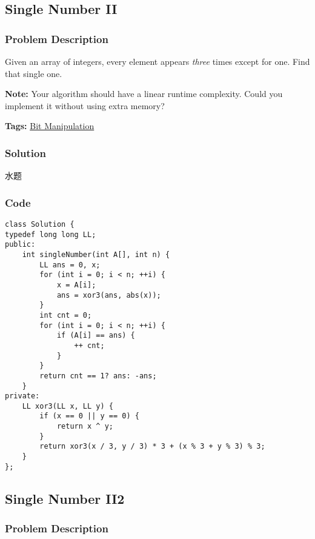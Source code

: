 \documentclass{article}
\begin{document}
\begin{CJK*}{UTF8}{gkai}
\subsection{ Single Number II }
\label{ Single Number II }

\subsubsection*{Problem Description}
Given an array of integers, every element appears \emph{three} times except for one. Find that single one.

\textbf{Note:}
Your algorithm should have a linear runtime complexity. Could you implement it without using extra memory?


\textbf{Tags: }
\hyperref[ Bit Manipulation ]{ Bit Manipulation }



\subsubsection*{Solution}
水题

\subsubsection*{Code}
\begin{lstlisting}
class Solution {
typedef long long LL;
public:
    int singleNumber(int A[], int n) {
        LL ans = 0, x;
        for (int i = 0; i < n; ++i) {
            x = A[i];
            ans = xor3(ans, abs(x));
        }
        int cnt = 0;
        for (int i = 0; i < n; ++i) {
            if (A[i] == ans) {
                ++ cnt;
            }
        }
        return cnt == 1? ans: -ans;
    }
private:
    LL xor3(LL x, LL y) {
        if (x == 0 || y == 0) {
            return x ^ y;
        }
        return xor3(x / 3, y / 3) * 3 + (x % 3 + y % 3) % 3;
    }
}; 
\end{lstlisting}


\subsection{ Single Number II2 }
\label{ Single Number II2 }

\subsubsection*{Problem Description}


\end{CJK*}
\end{document}
